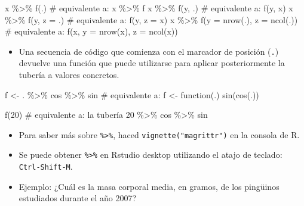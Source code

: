 \documentclass[
  letterpaper,
  DIV=11,
  numbers=noendperiod]{scrreprt}
\newenvironment{Shaded}{\begin{snugshade}}{\end{snugshade}}
\newcommand{\AttributeTok}[1]{\textcolor[rgb]{0.40,0.45,0.13}{#1}}
\newcommand{\CommentTok}[1]{\textcolor[rgb]{0.37,0.37,0.37}{#1}}
\newcommand{\DecValTok}[1]{\textcolor[rgb]{0.68,0.00,0.00}{#1}}
\newcommand{\FunctionTok}[1]{\textcolor[rgb]{0.28,0.35,0.67}{#1}}
\newcommand{\NormalTok}[1]{\textcolor[rgb]{0.00,0.23,0.31}{#1}}
\newcommand{\OtherTok}[1]{\textcolor[rgb]{0.00,0.23,0.31}{#1}}
\newcommand{\SpecialCharTok}[1]{\textcolor[rgb]{0.37,0.37,0.37}{#1}}
\providecommand{\tightlist}{%
  \setlength{\itemsep}{0pt}\setlength{\parskip}{0pt}}\usepackage{longtable,booktabs,array}
\begin{document}
\begin{Shaded}
\begin{Highlighting}[]
\NormalTok{x }\SpecialCharTok{\%\textgreater{}\%} \FunctionTok{f}\NormalTok{(.) }\CommentTok{\# equivalente a: x \%\textgreater{}\% f}
\NormalTok{x }\SpecialCharTok{\%\textgreater{}\%} \FunctionTok{f}\NormalTok{(y, .) }\CommentTok{\# equivalente a: f(y, x)}
\NormalTok{x }\SpecialCharTok{\%\textgreater{}\%} \FunctionTok{f}\NormalTok{(y, }\AttributeTok{z =}\NormalTok{ .) }\CommentTok{\# equivalente a: f(y, z = x)}
\NormalTok{x }\SpecialCharTok{\%\textgreater{}\%} \FunctionTok{f}\NormalTok{(}\AttributeTok{y =} \FunctionTok{nrow}\NormalTok{(.),}
        \AttributeTok{z =} \FunctionTok{ncol}\NormalTok{(.))  }\CommentTok{\# equivalente a: f(x, y = nrow(x), z = ncol(x))}
\end{Highlighting}
\end{Shaded}

\begin{itemize}
\tightlist
\item
  Una secuencia de código que comienza con el marcador de posición
  (\texttt{.}) devuelve una función que puede utilizarse para aplicar
  posteriormente la tubería a valores concretos.
\end{itemize}

\begin{Shaded}
\begin{Highlighting}[]
\NormalTok{f }\OtherTok{\textless{}{-}}\NormalTok{ . }\SpecialCharTok{\%\textgreater{}\%}\NormalTok{ cos }\SpecialCharTok{\%\textgreater{}\%}\NormalTok{ sin }\CommentTok{\# equivalente a: f \textless{}{-} function(.) sin(cos(.))}
\end{Highlighting}
\end{Shaded}

\begin{Shaded}
\begin{Highlighting}[]
\FunctionTok{f}\NormalTok{(}\DecValTok{20}\NormalTok{) }\CommentTok{\# equivalente a: la tubería 20 \%\textgreater{}\% cos \%\textgreater{}\% sin}
\end{Highlighting}
\end{Shaded}

\begin{itemize}
\item
  Para saber más sobre \texttt{\%\textgreater{}\%}, haced
  \texttt{vignette("magrittr")} en la consola de R.
\item
  Se puede obtener \texttt{\%\textgreater{}\%} en Rstudio desktop
  utilizando el atajo de teclado: \texttt{Ctrl-Shift-M}.
\item
  {Ejemplo:} ¿Cuál es la masa corporal media, en gramos, de los
  pingüinos estudiados durante el año 2007?
\end{itemize}
\end{document}
